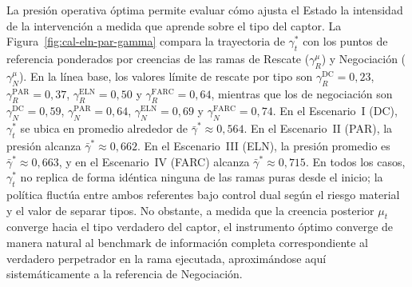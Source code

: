 \documentclass[pdflatex,sn-mathphys-ay]{sn-jnl}
\theoremstyle{thmstyleone}
\theoremstyle{thmstyletwo}
\theoremstyle{thmstylethree}
\newcommand{\1}{\mathbf{1}}
\begin{document}
La presión operativa óptima permite evaluar cómo ajusta el Estado la intensidad de la intervención a medida que aprende sobre el tipo del captor. La Figura~\ref{fig:cal-eln-par-gamma} compara la trayectoria de $\gamma_t^\ast$ con los puntos de referencia ponderados por creencias de las ramas de Rescate ($\gamma_R^\mu$) y Negociación ($\gamma_N^\mu$). En la línea base, los valores límite de rescate por tipo son $\gamma_R^{\mathrm{DC}}=0{,}23$, $\gamma_R^{\mathrm{PAR}}=0{,}37$, $\gamma_R^{\mathrm{ELN}}=0{,}50$ y $\gamma_R^{\mathrm{FARC}}=0{,}64$, mientras que los de negociación son $\gamma_N^{\mathrm{DC}}=0{,}59$, $\gamma_N^{\mathrm{PAR}}=0{,}64$, $\gamma_N^{\mathrm{ELN}}=0{,}69$ y $\gamma_N^{\mathrm{FARC}}=0{,}74$. En el Escenario~I (DC), $\gamma_t^\ast$ se ubica en promedio alrededor de $\bar\gamma^\ast\approx 0{,}564$. En el Escenario~II (PAR), la presión alcanza $\bar\gamma^\ast\approx 0{,}662$. En el Escenario~III (ELN), la presión promedio es $\bar\gamma^\ast\approx 0{,}663$, y en el Escenario~IV (FARC) alcanza $\bar\gamma^\ast\approx 0{,}715$. En todos los casos, $\gamma_t^\ast$ no replica de forma idéntica ninguna de las ramas puras desde el inicio; la política fluctúa entre ambos referentes bajo control dual según el riesgo material y el valor de separar tipos. No obstante, a medida que la creencia posterior $\mu_t$ converge hacia el tipo verdadero del captor, el instrumento óptimo converge de manera natural al benchmark de información completa correspondiente al verdadero perpetrador en la rama ejecutada, aproximándose aquí sistemáticamente a la referencia de Negociación.
\end{document}

